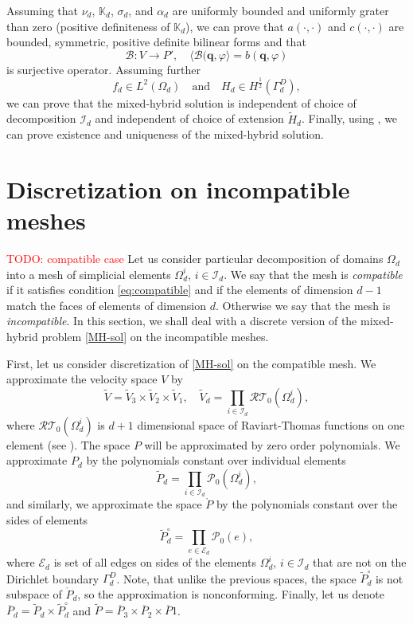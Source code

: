\documentclass[times]{nlaauth}%
\def\to{\rightarrow}
\def\vc#1{\mathbf{\boldsymbol{#1}}}     %
\def\tn#1{{\mathbb{#1}}}    %
\def\ol#1{\overline{#1}}
\def\phi{\varphi}
\def\todo#1{\textcolor{red}{TODO: #1} }
\begin{document}
Assuming that $\nu_d$, $\tn K_d$, $\sigma_d$, and $\alpha_d$ are uniformly bounded and
uniformly grater than zero (positive definiteness of $\tn K_d$), we can prove that 
$a(\cdot,\cdot)$ and $c(\cdot,\cdot)$ are bounded, symmetric, positive definite bilinear forms and that
\[
  \mathcal{B}: V\to P',\quad \langle \mathcal{B}(\vc{q}, \phi \rangle = b(\vc{q},\phi)
\]
is surjective operator. Assuming further    
\[
   f_d\in L^2(\Omega_d) \quad \text{and} \quad  H_d\in H^{\frac12}(\Gamma_d^D),
\]
we can prove that the mixed-hybrid solution is independent of choice of decomposition $\mathcal{I}_d$ and independent of choice of 
extension $\tilde H_d$. Finally, using \cite[Theorem 1.2]{fortin_mixed_1991}, we can prove
existence and uniqueness of the mixed-hybrid solution. 

\section{Discretization on incompatible meshes}
\todo{ compatible case}
Let us consider particular decomposition of domains $\Omega_d$ into a mesh of simplicial elements $\Omega_d^i$, $i\in \mathcal{I}_d$. 
We say that the mesh is 
{\it compatible} if it satisfies condition \eqref{eq:compatible} and if the elements of dimension $d-1$ match 
the faces of elements of dimension $d$. Otherwise we say that the mesh is {\it incompatible}. In this section, we shall deal
with a discrete version of the mixed-hybrid problem \ref{MH-sol} on the incompatible meshes.

First, let us consider discretization of \ref{MH-sol} on the compatible mesh. We approximate the velocity space $V$ by
\begin{equation}
    \label{DVspace}
       \tilde{V}=\tilde{V}_3\times \tilde{V}_2\times \tilde{V}_1,\quad 
                \tilde{V}_d= \prod_{i\in \mathcal{I}_d} \mathcal{RT}_0(\Omega_d^i),
\end{equation}
where $\mathcal{RT}_0(\Omega_d^i)$ is $d+1$ dimensional space of Raviart-Thomas functions on one element (see \cite{fortin_mixed_1991}).
The space $P$ will 
be approximated by zero order polynomials. We approximate $P_d$ by the polynomials constant over individual elements
\begin{equation}
   \tilde{P}_d=  \prod_{i\in \mathcal{I}_d} \mathcal{P}_0(\Omega_d^i),
\end{equation}
and similarly, we approximate the space $\mathring{P}$ by the polynomials constant over the sides of elements
\begin{equation}
        \tilde{P}^\circ_d=\prod_{e\in \mathcal{E}_d} \mathcal{P}_0(e),
\end{equation}
where $\mathcal{E}_d$ is set of all edges on sides of the elements $\Omega_d^i$, $i\in \mathcal{I}_d$ 
that are not on the Dirichlet boundary $\Gamma_d^D$.
Note, that unlike the previous spaces, the space $\tilde{P}^\circ_d$ is not subspace of $\mathring{P}_d$, so
the approximation is nonconforming. Finally, let us denote $\ol P_d = \tilde{P}_d \times \tilde{P}^\circ_d$ and 
$\tilde P = \ol P_3 \times \ol P_2 \times  \ol P1$.
\end{document}
